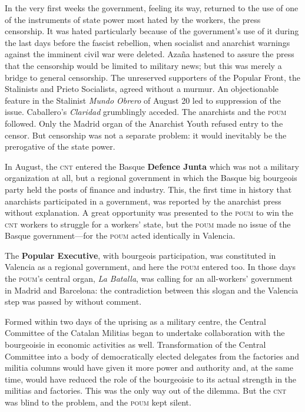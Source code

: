 In the very first weeks the government, feeling its way, returned to the use of one of the instruments of state power most hated by the workers, the press censorship. It was hated particularly because of the government’s use of it during the last days before the fascist rebellion, when socialist and anarchist warnings against the imminent civil war were deleted. Azaña hastened to assure the press that the censorship would be limited to military news; but this was merely a bridge to general censorship. The unreserved supporters of the Popular Front, the Stalinists and Prieto Socialists, agreed without a murmur. An objectionable feature in the Stalinist \emph{Mundo Obrero} of August 20 led to suppression of the issue. Caballero’s \emph{Claridad} grumblingly acceded. The anarchists and the \textsc{poum} followed. Only the Madrid organ of the Anarchist Youth refused entry to the censor. But censorship was not a separate problem: it would inevitably be the prerogative of the state power.

In August, the \textsc{cnt} entered the Basque \textbf{Defence Junta} which was not a military organization at all, but a regional government in which the Basque big bourgeois party held the posts of finance and industry. This, the first time in history that anarchists participated in a government, was reported by the anarchist press without explanation. A great opportunity was presented to the \textsc{poum} to win the \textsc{cnt} workers to struggle for a workers’ state, but the \textsc{poum} made no issue of the Basque government---for the \textsc{poum} acted identically in Valencia.

The \textbf{Popular Executive}, with bourgeois participation, was constituted in Valencia as a regional government, and here the \textsc{poum} entered too. In those days the \textsc{poum}’s central organ, \emph{La Batalla}, was calling for an all-workers’ government in Madrid and Barcelona: the contradiction between this slogan and the Valencia step was passed by without comment.

Formed within two days of the uprising as a military centre, the Central Committee of the Catalan Militias began to undertake collaboration with the bourgeoisie in economic activities as well. Transformation of the Central Committee into a body of democratically elected delegates from the factories and militia columns would have given it more power and authority and, at the same time, would have reduced the role of the bourgeoisie to its actual strength in the militias and factories. This was the only way out of the dilemma. But the \textsc{cnt} was blind to the problem, and the \textsc{poum} kept silent.


